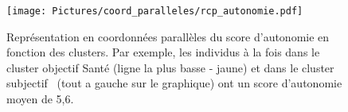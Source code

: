 \documentclass[11pt,fleqn,openany,frenchb]{book} %
\begin{document}

\begin{figure}[!h]
\centering
\texttt{[image: Pictures/coord\_paralleles/rcp\_autonomie.pdf]}
\caption{Représentation en coordonnées parallèles du score d'autonomie en fonction des clusters. Par exemple, les individus à la fois dans le cluster objectif Santé (ligne la plus basse - jaune) et dans le cluster subjectif \HEUR\ (tout a gauche sur le graphique) ont un score d'autonomie moyen de 5,6.}
\label{fig:rcpautonomie}
\end{figure}

\end{document}
